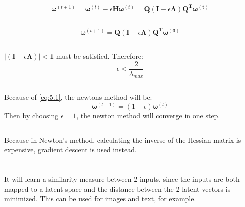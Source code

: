 \documentclass[11pt]{scrartcl} %
\begin{document}
	\subsection{}
		\begin{equation}
			\boldsymbol{\omega}^{(t+1)} = \boldsymbol{\omega}^{(t)} - 
			\epsilon\boldsymbol{H}\boldsymbol{\omega}^{(t)} =
			\boldsymbol{Q}(\boldsymbol{I} - \epsilon \boldsymbol{\Lambda})\boldsymbol{Q^T \omega^{(t)}}
		\end{equation}
	\subsection{}
		\begin{equation}
			\boldsymbol{\omega}^{(t+1)} = 
			\boldsymbol{Q}(\boldsymbol{I} - \epsilon \boldsymbol{\Lambda})\boldsymbol{Q^T \omega^{(0)}}
		\end{equation}
	\subsection{}
		$|(\boldsymbol{I} - \epsilon \boldsymbol{\Lambda})|<\boldsymbol{1}$ must be satisfied. Therefore:
		\begin{equation}
			\epsilon < \frac{2}{\lambda_{max}}
		\end{equation}
	\subsection{}
		Because of \ref{eq:5.1}, the newtons method will be:
		\begin{equation}
			\boldsymbol{\omega}^{(t+1)} = (1-\epsilon)\boldsymbol{\omega}^{(t)}
		\end{equation}
		Then by choosing $\epsilon = 1$, the newton method will converge in one step.
	\subsection{}
	 Because in Newton's method, calculating the inverse of the Hessian matrix is expensive,
	 gradient descent is used instead.

\section{} %
\subsection{}
It will learn a similarity measure between 2 inputs, since the inputs are both mapped to a latent
space and the distance between the 2 latent vectors is minimized. This can be used for images 
and text, for example.
\end{document}
